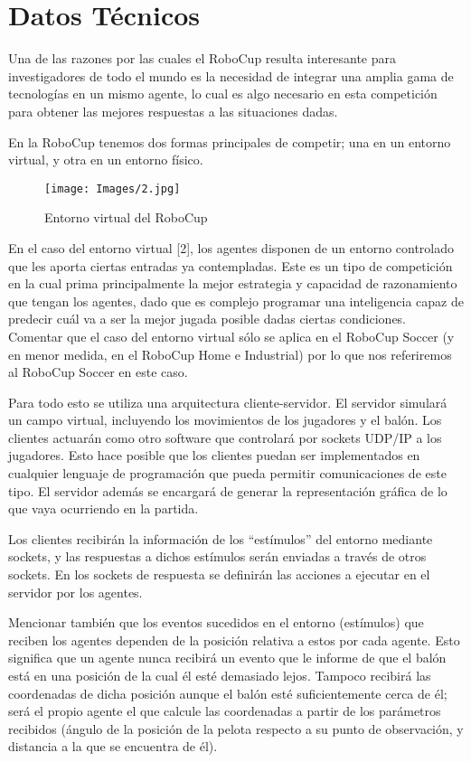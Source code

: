 \documentclass[11pt,oneside,a4paper]{book}
\begin{document}
\section{Datos Técnicos}
Una de las razones por las cuales el RoboCup resulta interesante para investigadores de todo el mundo es la necesidad de integrar una amplia gama de tecnologías en un mismo agente, lo cual es algo necesario en esta competición para obtener las mejores respuestas a las situaciones dadas.

En la RoboCup tenemos dos formas principales de competir; una en un entorno virtual, y otra en un entorno físico.
\begin{figure}[H]
\begin{center}
\texttt{[image: Images/2.jpg]}
\caption{Entorno virtual del RoboCup}
\end{center}
\end{figure}
En el caso del entorno virtual [2], los agentes disponen de un entorno controlado que les aporta ciertas entradas ya contempladas. Este es un tipo de competición en la cual prima principalmente la mejor estrategia y capacidad de razonamiento que tengan los agentes, dado que es complejo programar una inteligencia capaz de predecir cuál va a ser la mejor jugada posible dadas ciertas condiciones. Comentar que el caso del entorno virtual sólo se aplica en el RoboCup Soccer (y en menor medida, en el RoboCup Home e Industrial) por lo que nos referiremos al RoboCup Soccer en este caso.

Para todo esto se utiliza una arquitectura cliente-servidor. El servidor simulará un campo virtual, incluyendo los movimientos de los jugadores y el balón. Los clientes actuarán como otro software que controlará por sockets UDP/IP a los jugadores. Esto hace posible que los clientes puedan ser implementados en cualquier lenguaje de programación que pueda permitir comunicaciones de este tipo. El servidor además se encargará de generar la representación gráfica de lo que vaya ocurriendo en la partida.

Los clientes recibirán la información de los “estímulos” del entorno mediante sockets, y las respuestas a dichos estímulos serán enviadas a través de otros sockets. En los sockets de respuesta se definirán las acciones a ejecutar en el servidor por los agentes.

Mencionar también que los eventos sucedidos en el entorno (estímulos) que reciben los agentes dependen de la posición relativa a estos por cada agente. Esto significa que un agente nunca recibirá un evento que le informe de que el balón está en una posición de la cual él esté demasiado lejos. Tampoco recibirá las coordenadas de dicha posición aunque el balón esté suficientemente cerca de él; será el propio agente el que calcule las coordenadas a partir de los parámetros recibidos (ángulo de la posición de la pelota respecto a su punto de observación, y distancia a la que se encuentra de él).
\end{document}
